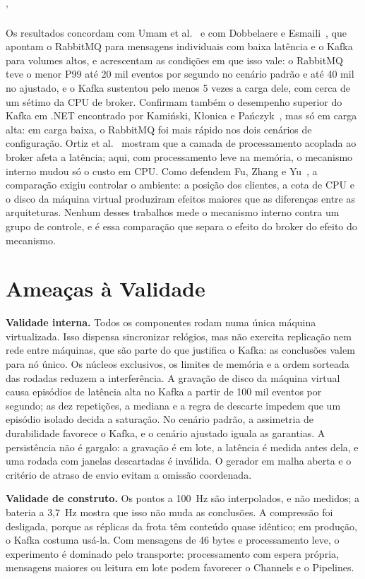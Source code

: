 '\documentclass[12pt]{article}
\begin{document}
Os resultados concordam com Umam et al.~\cite{umam:2026} e com Dobbelaere e
Esmaili~\cite{dobbelaere:2017}, que apontam o RabbitMQ para mensagens individuais com
baixa latência e o Kafka para volumes altos, e acrescentam as condições em que isso vale: o
RabbitMQ teve o menor P99 até 20 mil eventos por segundo no cenário padrão e até 40 mil no
ajustado, e o Kafka sustentou pelo menos 5 vezes a carga dele, com cerca de um sétimo da
CPU de broker. Confirmam também o desempenho superior do Kafka em .NET encontrado por
Kamiński, Kłonica e Pańczyk~\cite{kaminski:2025}, mas só em carga alta: em carga baixa, o
RabbitMQ foi mais rápido nos dois cenários de configuração. Ortiz et al.~\cite{ortiz:2023}
mostram que a camada de processamento acoplada ao broker afeta a latência; aqui, com
processamento leve na memória, o mecanismo interno mudou só o custo em CPU. Como defendem
Fu, Zhang e Yu~\cite{fu:2021}, a comparação exigiu controlar o ambiente: a posição dos
clientes, a cota de CPU e o disco da máquina virtual produziram efeitos maiores que as
diferenças entre as arquiteturas. Nenhum desses trabalhos mede o mecanismo interno contra
um grupo de controle, e é essa comparação que separa o efeito do broker do efeito do
mecanismo.


\section{Ameaças à Validade}
\label{sec:ameacas}

\textbf{Validade interna.} Todos os componentes rodam numa única máquina virtualizada.
Isso dispensa sincronizar relógios, mas não exercita replicação nem rede entre máquinas,
que são parte do que justifica o Kafka: as conclusões valem para nó único. Os núcleos
exclusivos, os limites de memória e a ordem sorteada das rodadas reduzem a interferência.
A gravação de disco da máquina virtual causa episódios de latência alta no Kafka a partir
de 100 mil eventos por segundo; as dez repetições, a mediana e a regra de descarte
impedem que um episódio isolado decida a saturação. No cenário padrão, a assimetria de
durabilidade favorece o Kafka, e o cenário ajustado iguala as garantias. A persistência
não é gargalo: a gravação é em lote, a latência é medida antes dela, e uma rodada com
janelas descartadas é inválida. O gerador em malha aberta e o critério de atraso de envio
evitam a omissão coordenada.

\textbf{Validade de construto.} Os pontos a 100~Hz são interpolados, e não medidos; a
bateria a 3,7~Hz mostra que isso não muda as conclusões. A compressão foi desligada,
porque as réplicas da frota têm conteúdo quase idêntico; em produção, o Kafka costuma
usá-la. Com mensagens de 46 bytes e processamento leve, o experimento é dominado pelo
transporte: processamento com espera própria, mensagens maiores ou leitura em lote podem
favorecer o Channels e o Pipelines.
\end{document}

